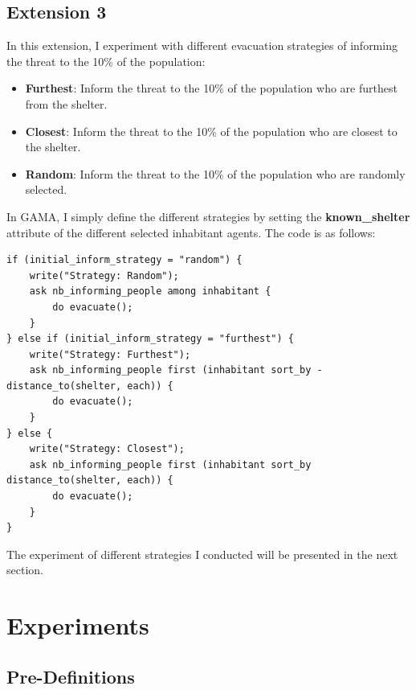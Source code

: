 \documentclass[12pt]{article}
\begin{document}
\subsection{Extension 3}

In this extension, I experiment with different evacuation strategies of informing the threat to the 10\% of the population: 
\begin{itemize}
    \item \textbf{Furthest}: Inform the threat to the 10\% of the population who are furthest from the shelter.
    \item \textbf{Closest}: Inform the threat to the 10\% of the population who are closest to the shelter.
    \item \textbf{Random}: Inform the threat to the 10\% of the population who are randomly selected.
\end{itemize}

In GAMA, I simply define the different strategies by setting the \textbf{known\_shelter} attribute of the different selected inhabitant agents. The code is as follows:

\begin{codebox}
\begin{lstlisting}[style=GAML]
if (initial_inform_strategy = "random") {
    write("Strategy: Random");
    ask nb_informing_people among inhabitant {
        do evacuate();
    }
} else if (initial_inform_strategy = "furthest") {
    write("Strategy: Furthest");
    ask nb_informing_people first (inhabitant sort_by -distance_to(shelter, each)) {
        do evacuate();
    }
} else {
    write("Strategy: Closest");
    ask nb_informing_people first (inhabitant sort_by distance_to(shelter, each)) {
        do evacuate();
    }
}
\end{lstlisting}
\end{codebox}

The experiment of different strategies I conducted will be presented in the next section.

\section{Experiments}

\subsection{Pre-Definitions}
\end{document}
